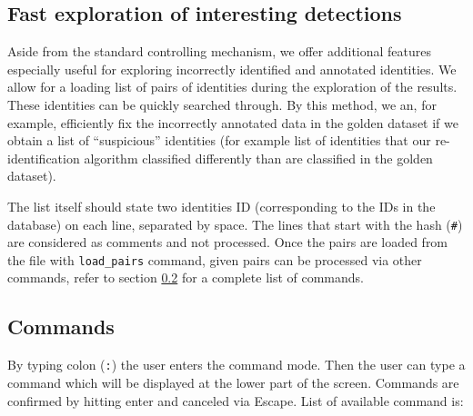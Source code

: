 \subsection{Fast exploration of interesting detections}

\label{subsec:exploration}

Aside from the standard controlling mechanism, we offer additional features especially
useful for exploring incorrectly identified and annotated identities. We allow
for a loading list of pairs of identities during the exploration of the results. These
identities can be quickly searched through. By this method, we an, for example, efficiently fix the incorrectly annotated data in the golden dataset if we obtain a list of ``suspicious'' identities (for example list of identities that our re-identification algorithm classified differently than are classified in the golden dataset).

The list itself should state two identities ID (corresponding to the IDs in the
database) on each line, separated by space. The lines that start with the hash (\verb+#+) are considered as comments and not processed. Once the pairs are loaded
from the file with \verb+load_pairs+ command, given pairs can be processed via other
commands, refer to section \ref{sec:commands} for a complete list of commands.

\subsection{Commands}
\label{sec:commands}

By typing colon (\verb+:+) the user enters the command mode. Then the user can type
a command which will be displayed at the lower part of the screen. Commands are confirmed
by hitting enter and canceled via Escape. List of available command is:

